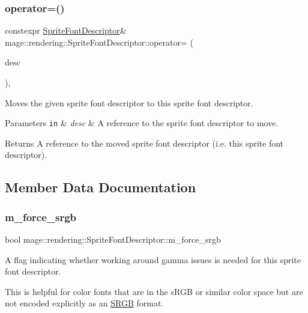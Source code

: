 \subsubsection{\texorpdfstring{operator=()}{operator=()}\hspace{0.1cm}{\footnotesize\ttfamily [2/2]}}
{\footnotesize\ttfamily constexpr \hyperlink{classmage_1_1rendering_1_1_sprite_font_descriptor}{Sprite\+Font\+Descriptor}\& mage\+::rendering\+::\+Sprite\+Font\+Descriptor\+::operator= (\begin{DoxyParamCaption}\item[{\hyperlink{classmage_1_1rendering_1_1_sprite_font_descriptor}{Sprite\+Font\+Descriptor} \&\&}]{desc }\end{DoxyParamCaption})\hspace{0.3cm}{\ttfamily [default]}, {\ttfamily [noexcept]}}

Moves the given sprite font descriptor to this sprite font descriptor.


\begin{DoxyParams}[1]{Parameters}
\mbox{\tt in}  & {\em desc} & A reference to the sprite font descriptor to move. \\
\hline
\end{DoxyParams}
\begin{DoxyReturn}{Returns}
A reference to the moved sprite font descriptor (i.\+e. this sprite font descriptor). 
\end{DoxyReturn}


\subsection{Member Data Documentation}
\hypertarget{classmage_1_1rendering_1_1_sprite_font_descriptor_abfb5c7d28df254c483c489be55736c76}{}\label{classmage_1_1rendering_1_1_sprite_font_descriptor_abfb5c7d28df254c483c489be55736c76} 
\subsubsection{\texorpdfstring{m\+\_\+force\+\_\+srgb}{m\_force\_srgb}}
{\footnotesize\ttfamily bool mage\+::rendering\+::\+Sprite\+Font\+Descriptor\+::m\+\_\+force\+\_\+srgb\hspace{0.3cm}{\ttfamily [private]}}

A flag indicating whether working around gamma issues is needed for this sprite font descriptor.

This is helpful for color fonts that are in the s\+R\+GB or similar color space but are not encoded explicitly as an \hyperlink{structmage_1_1_s_r_g_b}{S\+R\+GB} format. 